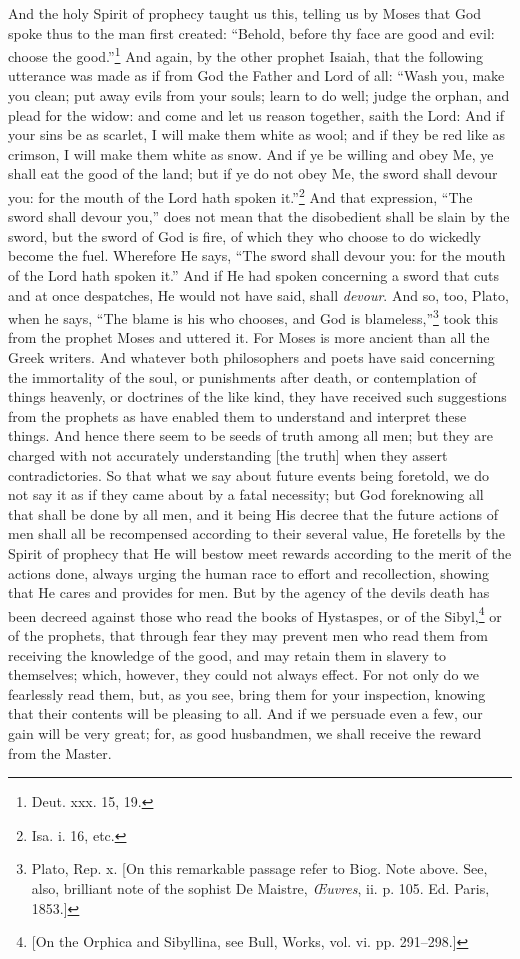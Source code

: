 And the holy Spirit of prophecy taught us this, telling us by Moses that God spoke thus to the man first created: “Behold, before thy face are good and evil: choose the good.”\footnote{Deut. xxx. 15, 19.} And again, by the other prophet Isaiah, that the following utterance was made as if from God the Father and Lord of all: “Wash you, make you clean; put away evils from your souls; learn to do well; judge the orphan, and plead for the widow: and come and let us reason together, saith the Lord: And if your sins be as scarlet, I will make them white as wool; and if they be red like as crimson, I will make them white as snow. And if ye be willing and obey Me, ye shall eat the good of the land; but if ye do not obey Me, the sword shall devour you: for the mouth of the Lord hath spoken it.”\footnote{Isa. i. 16, etc.} And that expression, “The sword shall devour you,” does not mean that the disobedient shall be slain by the sword, but the sword of God is fire, of which they who choose to do wickedly become the fuel. Wherefore He says, “The sword shall devour you: for the mouth of the Lord hath spoken it.” And if He had spoken concerning a sword that cuts and at once despatches, He would not have said, shall \emph{devour}. And so, too, Plato, when he says, “The blame is his who chooses, and God is blameless,”\footnote{Plato, Rep. x. [On this remarkable passage refer to Biog. Note above. See, also, brilliant note of the sophist De Maistre, \emph{Œuvres}, ii. p. 105. Ed. Paris, 1853.]} took this from the prophet Moses and uttered it. For Moses is more ancient than all the Greek writers. And whatever both philosophers and poets have said concerning the immortality of the soul, or punishments after death, or contemplation of things heavenly, or doctrines of the like kind, they have received such suggestions from the prophets as have enabled them to understand and interpret these things. And hence there seem to be seeds of truth among all men; but they are charged with not accurately understanding [the truth] when they assert contradictories. So that what we say about future events being foretold, we do not say it as if they came about by a fatal necessity; but God foreknowing all that shall be done by all men, and it being His decree that the future actions of men shall all be recompensed according to their several value, He foretells by the Spirit of prophecy that He will bestow meet rewards according to the merit of the actions done, always urging the human  race to effort and recollection, showing that He cares and provides for men. But by the agency of the devils death has been decreed against those who read the books of Hystaspes, or of the Sibyl,\footnote{[On the Orphica and Sibyllina, see Bull, Works, vol. vi. pp. 291–298.]} or of the prophets, that through fear they may prevent men who read them from receiving the knowledge of the good, and may retain them in slavery to themselves; which, however, they could not always effect. For not only do we fearlessly read them, but, as you see, bring them for your inspection, knowing that their contents will be pleasing to all. And if we persuade even a few, our gain will be very great; for, as good husbandmen, we shall receive the reward from the Master.

